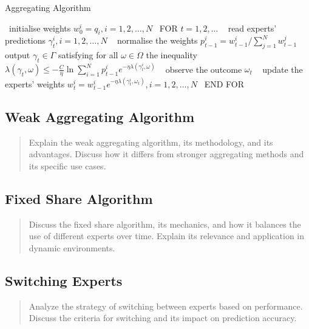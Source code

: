 \documentclass[11pt]{article} %
\theoremstyle{plain}
\theoremstyle{definition}
\begin{document}
\begin{algorithm}
  \caption{Aggregating Algorithm}\label{alg:cap}
  \begin{algorithmic}[1]
    \State\ initialise weights $w^i_0 = q_i, i = 1, 2, \ldots, N$
    \State\ FOR $t = 1, 2, \ldots$
    \State\ \hspace{\algorithmicindent} read experts' predictions $\gamma^i_t, i=1, 2, \ldots, N$
    \State\ \hspace{\algorithmicindent} normalise the weights $p^i_{t-1} = w^i_{t-1} / \sum^N_{j=1} w^j_{t-1}$
    \State\ \hspace{\algorithmicindent} output $\gamma_t \in \Gamma$ satisfying for all $\omega \in \Omega$ the inequality\newline\hspace*{\algorithmicindent}\hspace{\algorithmicindent} $\lambda(\gamma_t, \omega) \leq - \frac{C}{\eta} \ln \sum^N_{i=1}p^i_{t-1}e^{-\eta\lambda(\gamma^i_t, \omega)}$
    \State\ \hspace{\algorithmicindent} observe the outcome $\omega_t$
    \State\ \hspace{\algorithmicindent} update the experts' weights $w^i_t = w^i_{t-1} e^{-\eta \lambda(\gamma^i_t, \omega_t)}, i = 1, 2, \ldots, N$
    \State\ END FOR
  \end{algorithmic}
\end{algorithm}

\subsection{Weak Aggregating Algorithm}
\begin{quote}
  Explain the weak aggregating algorithm, its methodology, and its advantages. Discuss how it differs from stronger aggregating methods and its specific use cases.
\end{quote}

\subsection{Fixed Share Algorithm}
\begin{quote}
  Discuss the fixed share algorithm, its mechanics, and how it balances the use of different experts over time. Explain its relevance and application in dynamic environments.
\end{quote}

\subsection{Switching Experts}
\begin{quote}
  Analyze the strategy of switching between experts based on performance. Discuss the criteria for switching and its impact on prediction accuracy.
\end{quote}
\end{document}
